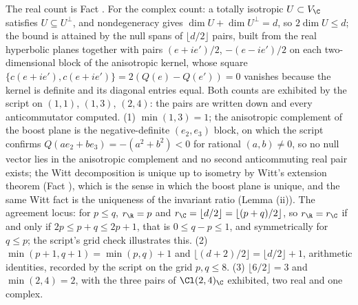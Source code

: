 The real count is Fact . For the complex count: a totally isotropic $U \subset V_{\C}$ satisfies $U \subseteq U^{\perp}$, and nondegeneracy gives $\dim U + \dim U^{\perp} = d$, so $2\dim U \leq d$; the bound is attained by the null spans of $\lfloor d/2 \rfloor$ pairs, built from the real hyperbolic planes together with pairs $(e + ie')/2$, $-(e - ie')/2$ on each two-dimensional block of the anisotropic kernel, whose square $\{c(e+ie'), c(e+ie')\} = 2(Q(e) - Q(e')) = 0$ vanishes because the kernel is definite and its diagonal entries equal. Both counts are exhibited by the script on $(1,1)$, $(1,3)$, $(2,4)$: the pairs are written down and every anticommutator computed. (1) $\min(1,3) = 1$; the anisotropic complement of the boost plane is the negative-definite $(e_{2}, e_{3})$ block, on which the script confirms $Q(ae_{2} + be_{3}) = -(a^{2} + b^{2}) < 0$ for rational $(a,b) \neq 0$, so no null vector lies in the anisotropic complement and no second anticommuting real pair exists; the Witt decomposition is unique up to isometry by Witt's extension theorem (Fact ), which is the sense in which the boost plane is unique, and the same Witt fact is the uniqueness of the invariant ratio (Lemma (ii)). The agreement locus: for $p \leq q$, $r_{\R} = p$ and $r_{\C} = \lfloor d/2 \rfloor = \lfloor (p+q)/2 \rfloor$, so $r_{\R} = r_{\C}$ if and only if $2p \leq p + q \leq 2p + 1$, that is $0 \leq q - p \leq 1$, and symmetrically for $q \leq p$; the script's grid check illustrates this. (2) $\min(p+1,q+1) = \min(p,q) + 1$ and $\lfloor (d+2)/2 \rfloor = \lfloor d/2 \rfloor + 1$, arithmetic identities, recorded by the script on the grid $p, q \leq 8$. (3) $\lfloor 6/2 \rfloor = 3$ and $\min(2,4) = 2$, with the three pairs of $\Cl(2,4)_{\C}$ exhibited, two real and one complex.
